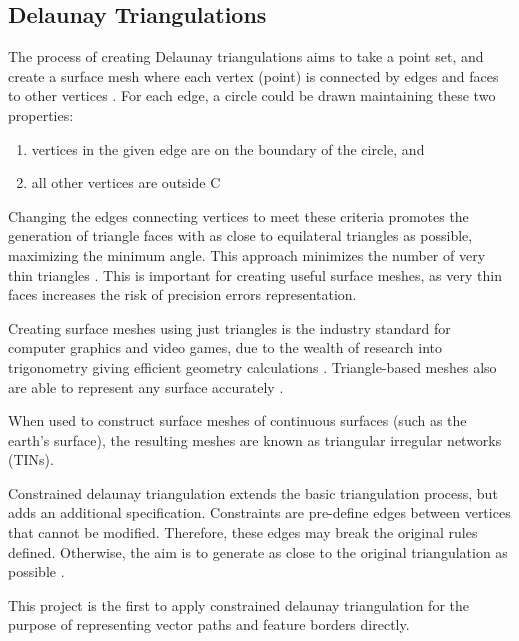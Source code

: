 \documentclass[12pt]{article}
\begin{document}
\subsection{Delaunay Triangulations}\label{section:cs:dt}

The process of creating Delaunay triangulations aims to take a point set, and create a surface mesh where each vertex (point) is connected by edges and faces to other vertices \autocite{preparata2012computational}. For each edge, a circle could be drawn maintaining these two properties:

\begin{enumerate}[(1)]
  \item vertices in the given edge are on the boundary of the circle, and
  \item all other vertices are outside C
\end{enumerate}

Changing the edges connecting vertices to meet these criteria promotes the generation of triangle faces with as close to equilateral triangles as possible, maximizing the minimum angle. This approach minimizes the number of very thin triangles \autocite{preparata2012computational}. This is important for creating useful surface meshes, as very thin faces increases the risk of precision errors  representation.

Creating surface meshes using just triangles is the industry standard for computer graphics and video games, due to the wealth of research into trigonometry giving efficient geometry calculations \autocite{marschner2018graphics}. Triangle-based meshes also are able to represent any surface accurately \autocite{perkins2013fielddstar}.

When used to construct surface meshes of continuous surfaces (such as the earth's surface), the resulting meshes are known as triangular irregular networks (TINs).


Constrained delaunay triangulation extends the basic triangulation process, but adds an additional specification. Constraints are pre-define edges between vertices that cannot be modified. Therefore, these edges may break the original rules defined. Otherwise, the aim is to generate as close to the original triangulation as possible \autocite{chew1987constraints}.

This project is the first to apply constrained delaunay triangulation for the purpose of representing vector paths and feature borders directly.

\end{document}
